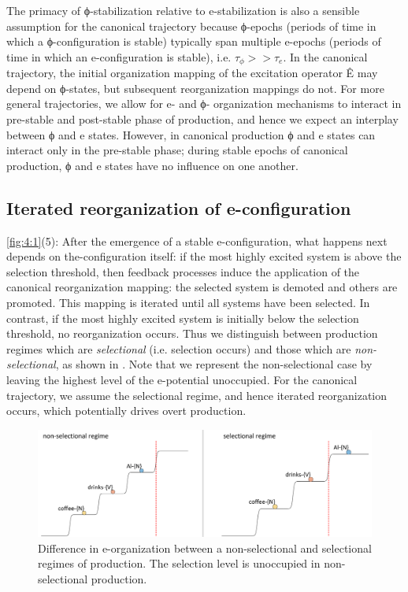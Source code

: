   The primacy of ϕ-stabilization relative to e-stabilization is also a sensible assumption for the canonical trajectory because ϕ-epochs (periods of time in which a ϕ-configuration is stable) typically span multiple e-epochs (periods of time in which an e-configuration is stable), i.e. $\tau_{\phi} >> \tau_e$. In the canonical trajectory, the initial organization mapping of the excitation operator Ê may depend on ϕ-states, but subsequent reorganization mappings do not. For more general trajectories, we allow for e- and ϕ- organization mechanisms to interact in pre-stable and post-stable phase of production, and hence we expect an interplay between ϕ and e states. However, in canonical production ϕ and e states can interact only in the pre-stable phase; during stable epochs of canonical production, ϕ and e states have no influence on one another. 

\subsection{Iterated reorganization of e-configuration}

\ref{fig:4:1}(5): After the emergence of a stable e-configuration, what happens next depends on the-configuration itself: if the most highly excited system is above the selection threshold, then feedback processes induce the application of the canonical reorganization mapping: the selected system is demoted and others are promoted. This mapping is iterated until all systems have been selected. In contrast, if the most highly excited system is initially below the selection threshold, no reorganization occurs. Thus we distinguish between production regimes which are \textit{selectional} (i.e. selection occurs) and those which are \textit{non-selectional}, as shown in {}. Note that we represent the non-selectional case by leaving the highest level of the e-potential unoccupied. For the canonical trajectory, we assume the selectional regime, and hence iterated reorganization occurs, which potentially drives overt production. 

  
\begin{figure}
\includegraphics[width=\textwidth]{figures/Tilsen-img53.png}
\caption{Difference in e-organization between a non-selectional and selectional regimes of production. The selection level is unoccupied in non-selectional production.}
\label{fig:4:3}
\end{figure}
 


